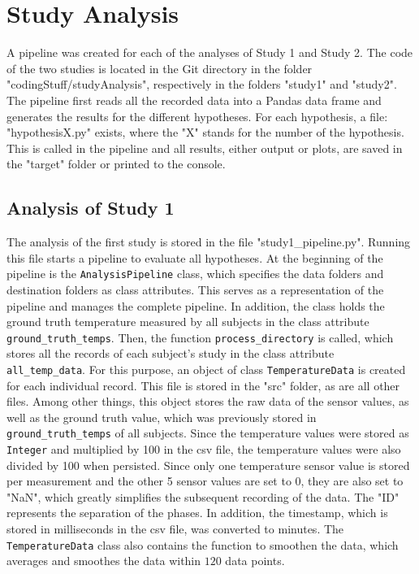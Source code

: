 \section{Study Analysis}
A pipeline was created for each of the analyses of Study 1 and Study 2. 
The code of the two studies is located in the Git directory in the folder "codingStuff/studyAnalysis", respectively in the folders "study1" and "study2".
The pipeline first reads all the recorded data into a Pandas data frame and generates the results for the different hypotheses.
For each hypothesis, a file: "hypothesisX.py" exists, where the "X" stands for the number of the hypothesis. 
This is called in the pipeline and all results, either output or plots, are saved in the "target" folder or printed to the console.

\subsection{Analysis of Study 1}
The analysis of the first study is stored in the file "study1\_pipeline.py". 
Running this file starts a pipeline to evaluate all hypotheses.
At the beginning of the pipeline is the \texttt{AnalysisPipeline} class, which specifies the data folders and destination folders as class attributes. 
This serves as a representation of the pipeline and manages the complete pipeline.
In addition, the class holds the ground truth temperature measured by all subjects in the class attribute \texttt{ground\_truth\_temps}.
Then, the function \texttt{process\_directory} is called, which stores all the records of each subject's study in the class attribute \texttt{all\_temp\_data}.
For this purpose, an object of class \texttt{TemperatureData} is created for each individual record.
This file is stored in the "src" folder, as are all other files.
Among other things, this object stores the raw data of the sensor values, as well as the ground truth value, which was previously stored in \texttt{ground\_truth\_temps} of all subjects.
Since the temperature values were stored as \texttt{Integer} and multiplied by 100 in the csv file, the temperature values were also divided by 100 when persisted.
Since only one temperature sensor value is stored per measurement and the other 5 sensor values are set to 0, they are also set to "NaN", which greatly simplifies the subsequent recording of the data.
The "ID" represents the separation of the phases.
In addition, the timestamp, which is stored in milliseconds in the csv file, was converted to minutes.
The \texttt{TemperatureData} class also contains the function to smoothen the data, which averages and smoothes the data within $120$ data points.
